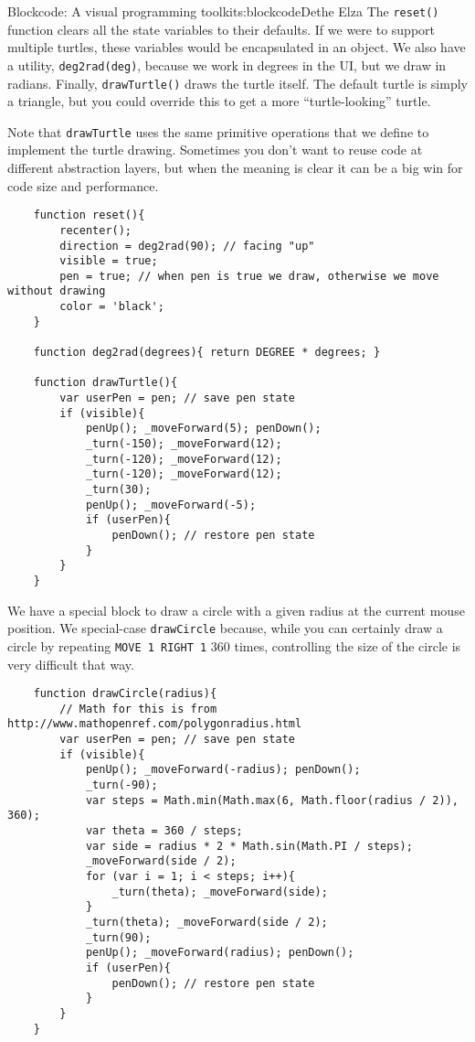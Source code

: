 \begin{aosachapter}{Blockcode: A visual programming toolkit}{s:blockcode}{Dethe Elza}
The \texttt{reset()} function clears all the state variables to their
defaults. If we were to support multiple turtles, these variables would
be encapsulated in an object. We also have a utility,
\texttt{deg2rad(deg)}, because we work in degrees in the UI, but we draw
in radians. Finally, \texttt{drawTurtle()} draws the turtle itself. The
default turtle is simply a triangle, but you could override this to get
a more ``turtle-looking'' turtle.

Note that \texttt{drawTurtle} uses the same primitive operations that we
define to implement the turtle drawing. Sometimes you don't want to
reuse code at different abstraction layers, but when the meaning is
clear it can be a big win for code size and performance.

\begin{verbatim}
    function reset(){
        recenter();
        direction = deg2rad(90); // facing "up"
        visible = true;
        pen = true; // when pen is true we draw, otherwise we move without drawing
        color = 'black';
    }

    function deg2rad(degrees){ return DEGREE * degrees; }

    function drawTurtle(){
        var userPen = pen; // save pen state
        if (visible){
            penUp(); _moveForward(5); penDown();
            _turn(-150); _moveForward(12);
            _turn(-120); _moveForward(12);
            _turn(-120); _moveForward(12);
            _turn(30);
            penUp(); _moveForward(-5);
            if (userPen){
                penDown(); // restore pen state
            }
        }
    }
\end{verbatim}

We have a special block to draw a circle with a given radius at the
current mouse position. We special-case \texttt{drawCircle} because,
while you can certainly draw a circle by repeating
\texttt{MOVE 1 RIGHT 1} 360 times, controlling the size of the circle is
very difficult that way.

\begin{verbatim}
    function drawCircle(radius){
        // Math for this is from http://www.mathopenref.com/polygonradius.html
        var userPen = pen; // save pen state
        if (visible){
            penUp(); _moveForward(-radius); penDown();
            _turn(-90);
            var steps = Math.min(Math.max(6, Math.floor(radius / 2)), 360);
            var theta = 360 / steps;
            var side = radius * 2 * Math.sin(Math.PI / steps);
            _moveForward(side / 2);
            for (var i = 1; i < steps; i++){
                _turn(theta); _moveForward(side);
            }
            _turn(theta); _moveForward(side / 2);
            _turn(90);
            penUp(); _moveForward(radius); penDown();
            if (userPen){
                penDown(); // restore pen state
            }
        }
    }
\end{verbatim}


\end{aosachapter}
